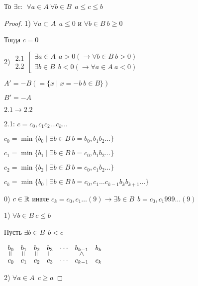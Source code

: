 \documentclass[12pt, a4paper]{article}
\begin{document}
    То $\exists c: \ \ \forall a \in A \ \forall b \in B \ \ a \leq c \leq b$
    \begin{proof}

        1) $\forall a \subset A \ \ a \leq 0$ и $\forall b \in B \ b \geq 0$

        Тогда $c = 0$

        2) $\begin{array}{c}
            2.1\\
            2.2
        \end{array}\left[\begin{array}{c}
            \exists a \in A \ \ a > 0 (\to \forall b \in B \ b > 0)\\
            \exists b \in B \ \ b < 0 (\to \forall a \in A \ a < 0)
        \end{array}\right.$

        $A' = -B (=\{x \mid x = -b \ b \in B\})$

        $B' = -A$
        
        $2.1 \to 2.2$

        2.1: $c = c_0, c_1 c_2 \dots c_k \dots$

        $c_0 = \min \{b_0 \mid \exists b \in B \ b = b_0, b_1 b_2 \dots\}$

        $c_1 = \min \{b_1 \mid \exists b \in B \ b = c_0, b_1 b_2 \dots\}$

        $c_2 = \min \{b_2 \mid \exists b \in B \ b = c_0, c_1 b_2 \dots\}$

        $c_k = \min \{b_0 \mid \exists b \in B \ b = c_0, c_1 \dots c_{k-1} b_{k} b_{k+1}\dots\}$

        0) $c \in \mathbb{R}$ иначе $c_k = c_0, c_1 \dots (9) \to \exists b \in B \ \ b = c_0, c_1 999 \dots (9)$

        1) $\forall b \in B \ c \leq b$ 

        Пусть $\exists b \in B \ \ b < c$

        
    {
        \setlength{\arraycolsep}{1pt}
        $\begin{array}{ccccccc}
        b_0 & b_1 & b_2 & b_3 & \cdots & b_{k-1} & b_k \\[-0.3em]
        \verteq & \verteq & \verteq  & \verteq & & \rotatebox{90}{>} & \\[-0.3em]
        c_0 & c_1 & c_2 & c_3 & \cdots & c_{k-1} & c_k
        \end{array}
        $
    }

    2) $\forall a \in A \ \ c \geq a$


\end{proof}
\end{document}
